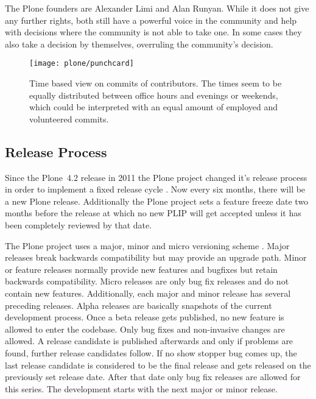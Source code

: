 The Plone founders are Alexander Limi and Alan Runyan. While it does not give
any further rights, both still have a powerful voice in the community and help
with decisions where the community is not able to take one. In some cases they
also take a decision by themselves, overruling the community's decision.

\begin{figure}[hbtp]
  \centering
  \texttt{[image: plone/punchcard]}
  \caption[Time based view on commits, Plone]
  {Time based view on commits of contributors. The times seem to be equally
    distributed between office hours and evenings or weekends, which could be
    interpreted with an equal amount of employed and volunteered commits.}
\end{figure}


\subsection{Release Process} %

Since the Plone~4.2 release in 2011 the Plone project changed it's release
process in order to implement a fixed release cycle
\cite{PloneFixedReleaseCycle}. Now every six months, there will be a new Plone
release. Additionally the Plone project sets a feature freeze date two months
before the release at which no new \ac{PLIP} will get accepted unless it has
been completely reviewed by that date.

The Plone project uses a major, minor and micro versioning scheme
\cite{PloneReleaseProcess,PloneCommunityProcesses}. Major releases break
backwards compatibility but may provide an upgrade path. Minor or feature
releases normally provide new features and bugfixes but retain backwards
compatibility. Micro releases are only bug fix releases and do not contain new
features. Additionally, each major and minor release has several preceding
releases. Alpha releases are basically snapshots of the current development
process. Once a beta release gets published, no new feature is allowed to enter
the codebase. Only bug fixes and non-invasive changes are allowed. A release
candidate is published afterwards and only if problems are found, further
release candidates follow. If no show stopper bug comes up, the last release
candidate is considered to be the final release and gets released on the
previously set release date. After that date only bug fix releases are allowed
for this series. The development starts with the next major or minor release.

